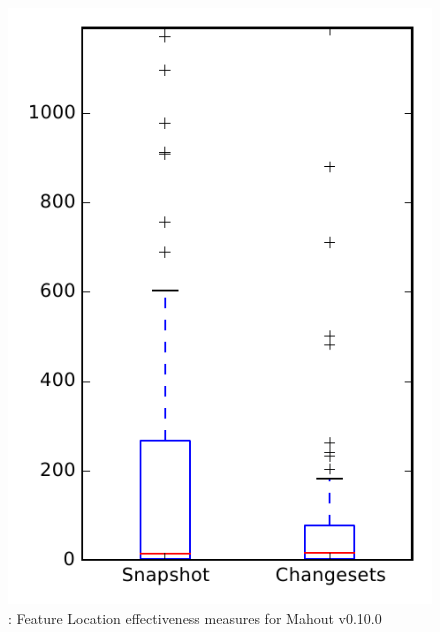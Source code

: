 
\begin{figure}
\centering
\includegraphics[height=0.4\textheight]{figures/flt/rq1_mahout}
\caption{\fone: Feature Location effectiveness measures for Mahout v0.10.0}
\label{fig:flt:rq1:mahout}
\end{figure}
